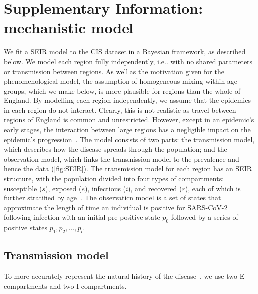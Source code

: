 \documentclass[9pt,twocolumn,twoside]{pnas-new}
\makeatletter
\DeclareRobustCommand\onedot{\futurelet\@let@token\@onedot}
\def\@onedot{\ifx\@let@token.\else.\null\fi\xspace}
\def\ie{i.e\onedot} \def\Ie{{I.e}\onedot}
\makeatother
\begin{document}


\section*{Supplementary Information: mechanistic model}

We fit a SEIR model to the CIS dataset in a Bayesian framework, as described below.
We model each region fully independently, \ie with no shared parameters or transmission between regions.
As well as the motivation given for the phenomenological model, the assumption of homogeneous mixing within age groups, which we make below, is more plausible for regions than the whole of England.
By modelling each region independently, we assume that the epidemics in each region do not interact.
Clearly, this is not realistic as travel between regions of England is common and unrestricted.
However, except in an epidemic's early stages, the interaction between large regions has a negligible impact on the epidemic's progression~\citep{birrellRealtimea,gogSpatial,eggoSpatial}.
The model consists of two parts: the transmission model, which describes how the disease spreads through the population; and the observation model, which links the transmission model to the prevalence and hence the data (\cref{fig:SEIR}).
The transmission model for each region has an SEIR structure, with the population divided into four types of compartments: susceptible ($s$), exposed ($e$), infectious ($i$), and recovered ($r$), each of which is further stratified by age~\citep{andersonInfectious,keelingModeling}.
The observation model is a set of states that approximate the length of time an individual is positive for SARS-CoV-2 following infection with an initial pre-positive state $p_0$ followed by a series of positive states $p_1, p_2, \dots, p_l$.



\subsection*{Transmission model}
To more accurately represent the natural history of the disease~\citep{wearingAppropriate}, we use two E compartments and two I compartments.
\end{document}
